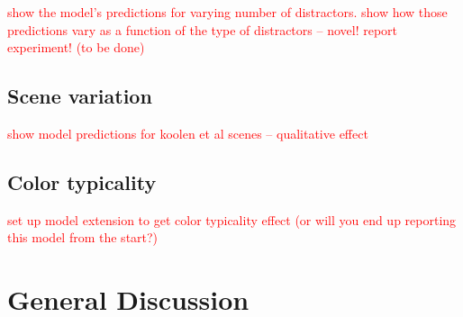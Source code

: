 \documentclass[11pt]{article}
\newcommand{\red}[1]{\textcolor{Red}{#1}}
\begin{document}
\red{show the model's predictions for varying number of distractors. show how those predictions vary as a function of the type of distractors -- novel! report experiment! (to be done)}

\subsection{Scene variation}
\label{sec:scenevarmodel}

\red{show model predictions for koolen et al scenes -- qualitative effect}

\subsection{Color typicality}
\label{sec:colortypmodel}

\red{set up model extension to get color typicality effect (or will you end up reporting this model from the start?)}

\section{General Discussion}
\label{sec:gd}



\appendix



\setlength{\bibleftmargin}{.125in}
\setlength{\bibindent}{-\bibleftmargin}


\end{document}
